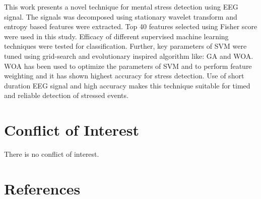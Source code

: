 \documentclass{article}
\begin{document}
This work presents a novel technique for mental stress detection using EEG signal. The signals was decomposed using stationary wavelet transform and entropy based features were extracted. Top 40 features selected using Fisher score were used in this study. Efficacy of different supervised machine learning techniques were tested for classification. Further, key parameters of SVM were tuned using grid-search and evolutionary inspired algorithm like: GA and WOA. WOA has been used to optimize the parameters of SVM and to perform feature weighting and it has shown highest accuracy for stress detection. Use of short duration EEG signal and high accuracy makes this technique suitable for timed and reliable detection of stressed events.

\section{Conflict of Interest}

There is no conflict of interest.

\section{References}
\end{document}

